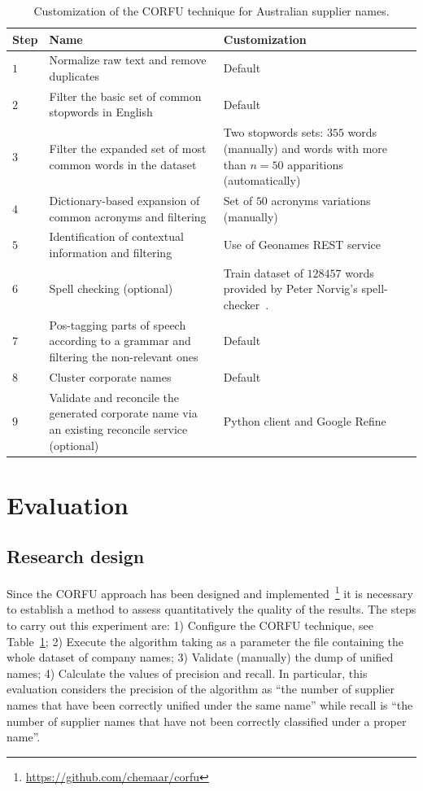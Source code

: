 \documentclass{llncs}
\begin{document}
\begin{table}[!htb]
\renewcommand{\arraystretch}{1.3}
\begin{center}
\begin{tabular}{|p{1cm}|p{5.5cm}|p{5.5cm}|}
\hline
  \textbf{Step} & \textbf{Name} & \textbf{Customization}  \\  \hline
  $1$ & Normalize raw text and remove duplicates & Default \\ \hline
  $2$ & Filter the basic set of common stopwords in English & Default\\ \hline
  $3$ & Filter the expanded set of most common words in the dataset & Two stopwords sets: $355$ words (manually) and words with more than $n=50 $ apparitions (automatically) \\ \hline
  $4$ & Dictionary-based expansion of common acronyms and filtering & Set of $50$ acronyms variations (manually) \\ \hline
  $5$ & Identification of contextual information and filtering & Use of Geonames REST service\\ \hline
  $6$ & Spell checking (optional) & Train dataset of $128457$ words provided by Peter Norvig's spell-checker~\cite{NorvigSpelling}. \\ \hline
  $7$ & Pos-tagging parts of speech according to a grammar and filtering the non-relevant ones & Default \\ \hline
  $8$ & Cluster corporate names & Default \\ \hline
  $9$ & Validate and reconcile the generated corporate name via an existing reconcile service (optional) & Python client and Google Refine \\ \hline
  \hline
  \end{tabular}
  \caption{Customization of the CORFU technique for Australian supplier names.}
  \label{config-corfu}
  \end{center}
\end{table} 

\section{Evaluation}
\subsection{Research design}
Since the CORFU approach has been designed and implemented~\footnote{\url{https://github.com/chemaar/corfu}} it is necessary to 
establish a method to assess quantitatively the quality of the results.  The steps to carry 
out this experiment are: 1) Configure the CORFU technique, see Table~\ref{config-corfu};  
2) Execute the algorithm taking as a parameter the file containing the whole dataset of company names;
3) Validate (manually) the dump of unified names; 4) Calculate the values of 
precision and recall. In particular, this evaluation considers the precision of the algorithm as ``the number of supplier 
names that have been correctly unified under the same name'' while recall is 
``the number of supplier names that have not been correctly classified under a proper name''. 
\end{document}
